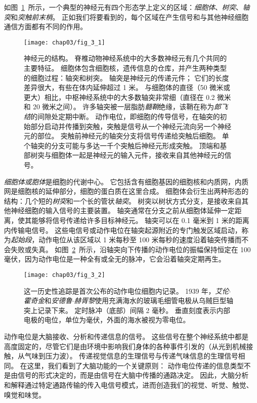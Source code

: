 如图~\ref{fig:3_1}~所示，一个典型的神经元有四个形态学上定义的区域：\textit{细胞体}、\textit{树突}、\textit{轴突}和\textit{突触前末梢}。
正如我们将要看到的，每个区域在产生信号和与其他神经细胞通信方面都有不同的作用。


\begin{figure}[htbp]
	\centering
	\texttt{[image: chap03/fig\_3\_1]}
	\caption{神经元的结构。 
		脊椎动物神经系统中的大多数神经元有几个共同的主要特征。
		细胞体包含细胞核，遗传信息的仓库，并产生两种类型的细胞过程：轴突和树突。 
		轴突是神经元的传递元件；
		它们的长度差异很大，有些在体内延伸超过 1 米。 
		与细胞体的直径（50 微米或更大）相比，中枢神经系统中的大多数轴突非常细（直径在 0.2 微米和 20 微米之间）。 
		许多轴突被一层脂肪\textit{髓鞘}绝缘，该鞘在称为\textit{郎飞结}的间隙处定期中断。 
		动作电位，即细胞的传导信号，在轴突的初始部分启动并传播到突触，突触是信号从一个神经元流向另一个神经元的部位。 
		突触前神经元的轴突分支将信号传递给突触后细胞。 
		单个轴突的分支可能与多达一千个突触后神经元形成突触。 	
		顶端和基部树突与细胞体一起是神经元的输入元件，接收来自其他神经元的信号。}
	\label{fig:3_1}
\end{figure}


\textit{细胞体或胞体}是细胞的代谢中心。 
它包括含有细胞基因的细胞核和内质网，内质网是细胞核的延伸部分，细胞的蛋白质在这里合成。
细胞体会衍生出两种形态的结构：几个短的\textit{树突}和一个长的管状\textit{轴突}。 
树突以树状方式分支，是接收来自其他神经细胞的输入信号的主要装置。 
轴突通常在分支之前从细胞体延伸一定距离，使其能够将信号传递给许多目标神经元。
轴突可以在 0.1 毫米到 1 米的距离内传输电信号。 
这些电信号或动作电位在轴突起源附近的专门触发区域启动，称为\textit{起始段}，动作电位从该区域以 1 米每秒至 100 米每秒的速度沿着轴突传播而不会失败或失真。 
如图~\ref{fig:3_2}~所示，沿轴突向下传播的动作电位的振幅保持恒定在 100 毫伏，因为动作电位是一种全有或全无的脉冲，它会沿着轴突定期再生。


\begin{figure}[htbp]
	\centering
	\texttt{[image: chap03/fig\_3\_2]}
	\caption{这一历史性追踪是首次公布的动作电位细胞内记录。 
		1939 年，\textit{艾伦$\cdot$霍奇金}和\textit{安德鲁$\cdot$赫胥黎}使用充满海水的玻璃毛细管电极从乌贼巨型轴突上记录下来。
		定时脉冲（底部）间隔 2 毫秒。 
		垂直刻度表示内部电极的电位，单位为毫伏，外面的海水被视为零电位\cite{hodgkin1939action}。}
	\label{fig:3_2}
\end{figure}


动作电位是大脑接收、分析和传递信息的信号。 
这些信号在整个神经系统中都是高度固定的，尽管它们是由环境中影响我们身体的各种事件引发的（从光到机械接触，从气味到压力波）。
传递视觉信息的生理信号与传递气味信息的生理信号相同。
在这里，我们看到了大脑功能的一个关键原则：
动作电位传递的信息类型不是由信号的形式决定的，而是由信号在大脑中传播的通路决定。
因此，大脑分析和解释通过特定通路传输的传入电信号模式，进而创造我们的视觉、听觉、触觉、嗅觉和味觉。


